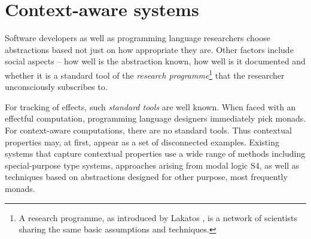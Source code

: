 

\chapter{Context-aware systems} 
\label{ch:applications} 

Software developers as well as programming language researchers choose abstractions based not 
just on how appropriate they are. Other factors include social aspects -- how well is the 
abstraction known, how well is it documented and whether it is a standard tool of the
\emph{research programme}\footnote{A research programme, as introduced by Lakatos \cite{philosophy-lakatos},
is a network of scientists sharing the same basic assumptions and techniques.} that the researcher
unconsciously subscribes to. 

For tracking of effects, such \emph{standard tools} are well known. When faced with an effectful 
computation, programming language designers immediately pick monads. For context-aware computations, 
there are no standard tools. Thus contextual properties may, at first, appear as a set of disconnected 
examples. Existing systems that capture contextual properties use a wide range of methods including 
special-purpose type systems, approaches arising from modal logic S4, as well as techniques based 
on abstractions designed for other purpose, most frequently monads.

